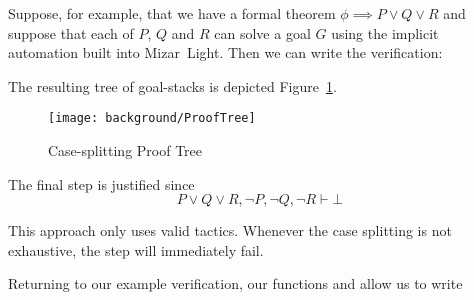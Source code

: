 Suppose, for example, that we have a formal theorem $\phi \implies P \vee Q \vee R$ and suppose that each of $P$, $Q$ and $R$ can solve a goal $G$ using the implicit automation built into Mizar~Light. Then we can write the verification:

\vspace{0.5cm}
\begin{minipage}{\linewidth}
  \footnotesize






\end{minipage}
\vspace{0.5cm}

The resulting tree of goal-stacks is depicted Figure~\ref{fig:CaseProofTree}.

\begin{figure}
\begin{center}
\texttt{[image: background/ProofTree]}
\end{center}
\caption{Case-splitting Proof Tree}
\label{fig:CaseProofTree}
\end{figure}

The final  step is justified since
\begin{displaymath}
P \vee Q \vee R, \neg P, \neg Q, \neg R \vdash \bot
\end{displaymath}

This approach only uses valid tactics. Whenever the case splitting is not exhaustive, the  step will immediately fail.

Returning to our example verification, our functions  and  allow us to write

\vspace{0.5cm}
\begin{minipage}{\linewidth}
  \footnotesize






\end{minipage}
\vspace{0.5cm}

